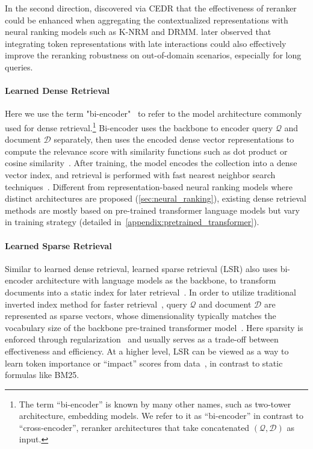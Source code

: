 In the second direction,
\citet{macavaney2019cedr} discovered via \textsc{CEDR} that the effectiveness of reranker could be enhanced when aggregating the contextualized representations with neural ranking models such as
\textsc{K-NRM} and \textsc{DRMM}.
\citet{zhang-etal-2024-celi} later observed that integrating token representations with late interactions could also effectively improve the reranking robustness on out-of-domain scenarios, 
especially for long queries. 

\paragraph{Learned Dense Retrieval}
Here we use the term "bi-encoder"~\cite{Humeau2020Poly-encoders} to refer to the model architecture commonly used for dense retrieval.\footnote{The term ``bi-encoder'' is known by many other names, such as two-tower architecture, embedding models. We refer to it as ``bi-encoder'' in contrast to ``cross-encoder'', reranker architectures that take concatenated $(\mathcal{Q}, \mathcal{D})$ as input.}
Bi-encoder uses the backbone to encoder query $\mathcal{Q}$ and document $\mathcal{D}$ separately, then uses the encoded dense vector representations to compute the relevance score with similarity functions such as dot product or cosine similarity~\cite{Xiong2020ApproximateNN,Karpukhin2020DensePR}. After training, the model encodes the collection into a dense vector index, and retrieval is performed with fast nearest neighbor search techniques~\cite{johnson2019billion,Malkov2016EfficientAR}.
Different from representation-based neural ranking models where distinct architectures are proposed (\cref{sec:neural_ranking}), existing dense retrieval methods are mostly based on pre-trained transformer language models but vary in training strategy (detailed in~\cref{appendix:pretrained_transformer}). 



\paragraph{Learned Sparse Retrieval}

Similar to learned dense retrieval, learned sparse retrieval (LSR) also uses bi-encoder architecture with language models as the backbone, to transform documents into a static index for later retrieval~\citep{zamani2018neural}. In order to utilize traditional inverted index method for faster retrieval~\cite{bruch2024efficient}, query $\mathcal{Q}$ and document $\mathcal{D}$ are represented as sparse vectors, whose dimensionality typically matches the vocabulary size of the backbone pre-trained transformer model~\citep{yu2024improved}. Here sparsity is enforced through regularization~\citep{formal21splade,Paria2020Minimizing} and usually serves as a trade-off between effectiveness and efficiency. At a higher level, LSR can be viewed as a way to learn token importance or ``impact'' scores from data~\cite{Dai2019DeeperTU,bai2020sparterm,mallia2021learning}, in contrast to static formulas like \textsc{BM25}.

